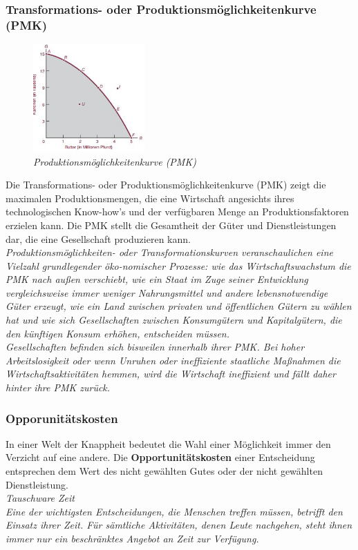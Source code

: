 \documentclass[10pt]{scrartcl}
\begin{document}
\subsubsection{Transformations- oder Produktionsmöglichkeitenkurve (PMK) }
\begin{figure}
  \begin{center}
    \includegraphics[width=0.38\textwidth]{img/pmk.jpg}
  \end{center}
  \caption{\it Produktionsmöglichkeitenkurve (PMK)}
\end{figure}
Die Transformations- oder Produktionsmöglichkeitenkurve (PMK) zeigt die maximalen Produktionsmengen, die eine Wirtschaft angesichts ihres technologischen Know-how's und der verfügbaren Menge an Produktionsfaktoren erzielen kann. Die PMK stellt die Gesamtheit der Güter und Dienstleistungen dar, die eine Gesellschaft produzieren kann.\\
{\it Produktionsmöglichkeiten- oder Transformationskurven veranschaulichen eine Vielzahl grundlegender öko-nomischer Prozesse: wie das Wirtschaftswachstum die PMK nach außen verschiebt, wie ein Staat im Zuge seiner Entwicklung vergleichsweise immer weniger Nahrungsmittel und andere lebensnotwendige Güter erzeugt, wie ein Land zwischen privaten und öffentlichen Gütern zu wählen hat und wie sich Gesellschaften zwischen Konsumgütern und Kapitalgütern, die den künftigen Konsum erhöhen, entscheiden müssen.\\
Gesellschaften befinden sich bisweilen innerhalb ihrer PMK. Bei hoher Arbeitslosigkeit oder wenn Unruhen oder ineffiziente staatliche Maßnahmen die Wirtschaftsaktivitäten hemmen, wird die Wirtschaft ineffizient und fällt daher hinter ihre PMK zurück.}\\
\subsubsection{Opporunitätskosten}
In einer Welt der Knappheit bedeutet die Wahl einer Möglichkeit immer den Verzicht auf eine andere. Die {\bf Opportunitätskosten } einer Entscheidung entsprechen dem Wert des nicht gewählten Gutes oder der nicht gewählten Dienstleistung.\\
{\it Tauschware Zeit \\
 Eine der wichtigsten Entscheidungen, die Menschen treffen müssen, betrifft den Einsatz ihrer Zeit. Für sämtliche Aktivitäten, denen Leute nachgehen, steht ihnen immer nur ein beschränktes Angebot an Zeit zur Verfügung. }
 \pagebreak
 
\end{document}
